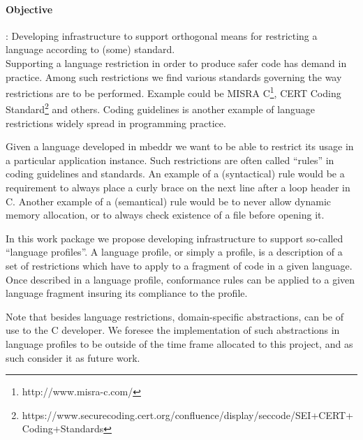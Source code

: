 \paragraph{\textbf{Objective}}: Developing infrastructure to support orthogonal
means for restricting a language according to (some) standard.\vspace{.2cm}\\
Supporting a language restriction in order to produce safer code has
demand in practice. Among such restrictions we find various standards
governing the way restrictions are to be performed. Example could be MISRA
C\footnote{http://www.misra-c.com/}, CERT Coding
Standard\footnote{https://www.securecoding.cert.org/confluence/display/seccode/SEI+CERT+Coding+Standards}
and others. Coding guidelines is another example of language restrictions 
widely spread in programming practice.

Given a language developed in mbeddr we want to be able to restrict its usage in
a particular application instance. Such restrictions are often called ``rules''
in coding guidelines and standards. An example of a (syntactical) rule would be
a requirement to always place a curly brace on the next line after a loop header
in C. Another example of a (semantical) rule would be to never allow dynamic
memory allocation, or to always check existence of a file before opening it.

In this work package we propose developing infrastructure to support
so-called ``language profiles''. A language profile, or simply a profile, is a
description of a set of restrictions which have to apply to a fragment of code
in a given language. Once described in a language profile, conformance rules
can be applied to a given language fragment insuring its compliance to the
profile.

Note that besides language restrictions, domain-specific abstractions,
can be of use to the C developer. We foresee the implementation of such
abstractions in language profiles to be outside of the time frame allocated to
this project, and as such consider it as future work.

  
